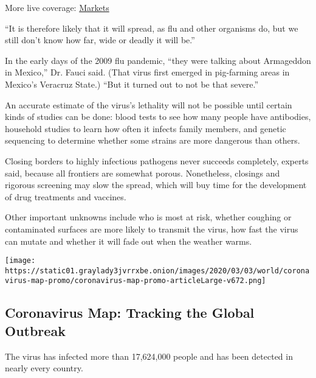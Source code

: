 More live coverage:
\href{https://www.nytimes3xbfgragh.onion/live/2020/07/31/business/stock-market-today-coronavirus?action=click\&pgtype=Article\&state=default\&region=MAIN_CONTENT_1\&context=storylines_live_updates}{Markets}

``It is therefore likely that it will spread, as flu and other organisms
do, but we still don't know how far, wide or deadly it will be.''

In the early days of the 2009 flu pandemic, ``they were talking about
Armageddon in Mexico,'' Dr. Fauci said. (That virus first emerged in
pig-farming areas in Mexico's Veracruz State.) ``But it turned out to
not be that severe.''

An accurate estimate of the virus's lethality will not be possible until
certain kinds of studies can be done: blood tests to see how many people
have antibodies, household studies to learn how often it infects family
members, and genetic sequencing to determine whether some strains are
more dangerous than others.

Closing borders to highly infectious pathogens never succeeds
completely, experts said, because all frontiers are somewhat porous.
Nonetheless, closings and rigorous screening may slow the spread, which
will buy time for the development of drug treatments and vaccines.

Other important unknowns include who is most at risk, whether coughing
or contaminated surfaces are more likely to transmit the virus, how fast
the virus can mutate and whether it will fade out when the weather
warms.

\href{https://www.nytimes3xbfgragh.onion/interactive/2020/world/coronavirus-maps.html}{}

\texttt{[image: https://static01.graylady3jvrrxbe.onion/images/2020/03/03/world/coronavirus-map-promo/coronavirus-map-promo-articleLarge-v672.png]}

\hypertarget{coronavirus-map-tracking-the-global-outbreak}{%
\subsection{Coronavirus Map: Tracking the Global
Outbreak}\label{coronavirus-map-tracking-the-global-outbreak}}

The virus has infected more than 17,624,000 people and has been detected
in nearly every country.

